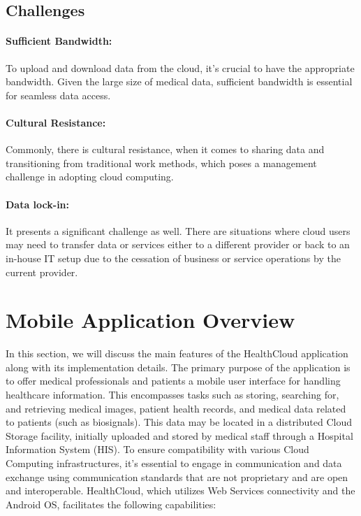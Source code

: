 \documentclass{article}
\begin{document}
\subsection{Challenges} 
\paragraph{Sufficient Bandwidth:} To upload and download data from the cloud, it's crucial to have the appropriate bandwidth. Given the large size of medical data, sufficient bandwidth is essential for seamless data access.
\paragraph{Cultural Resistance:} Commonly, there is cultural resistance, when it comes to sharing data and transitioning from traditional work methods, which poses a management challenge in adopting cloud computing.
\paragraph{Data lock-in:} It presents a significant challenge as well. There are situations where cloud users may need to transfer data or services either to a different provider or back to an in-house IT setup due to the cessation of business or service operations by the current provider.


\section{Mobile Application Overview} In this section, we will discuss the main features of the HealthCloud application along with its implementation details. The primary purpose of the application is to offer medical professionals and patients a mobile user interface for handling healthcare information. This encompasses tasks such as storing, searching for, and retrieving medical images, patient health records, and medical data related to patients (such as biosignals). This data may be located in a distributed Cloud Storage facility, initially uploaded and stored by medical staff through a Hospital Information System (HIS).
To ensure compatibility with various Cloud Computing infrastructures, it's essential to engage in communication and data exchange using communication standards that are not proprietary and are open and interoperable. HealthCloud, which utilizes Web Services connectivity and the Android OS, facilitates the following capabilities: \\
\end{document}
